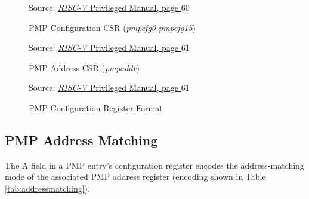 \begin{figure}[htbp]
  \centering
  \def\stackalignment{r}
  {\scriptsize Source: \href{https://drive.google.com/file/d/17GeetSnT5wW3xNuAHI95-SI1gPGd5sJ_/view}{\textit{RISC-V} Privileged Manual, page $60$}}
  \caption{PMP Configuration CSR (\textit{pmpcfg0-pmpcfg15})}
  \label{fig:pmpcfgs}
\end{figure}

\begin{figure}[htbp]
  \centering
  \def\stackalignment{r} %
  {\scriptsize Source: \href{https://drive.google.com/file/d/17GeetSnT5wW3xNuAHI95-SI1gPGd5sJ_/view}{\textit{RISC-V} Privileged Manual, page $61$}}
  \caption{PMP Address CSR (\textit{pmpaddr})}
  \label{fig:pmpaddr}
\end{figure}

\begin{figure}[htbp]
  \centering
  \def\stackalignment{r} %
  {\scriptsize Source: \href{https://drive.google.com/file/d/17GeetSnT5wW3xNuAHI95-SI1gPGd5sJ_/view}{\textit{RISC-V} Privileged Manual, page $61$}}
  \caption{PMP Configuration Register Format}
  \label{fig:pmpconf}
\end{figure}

\subsection{PMP Address Matching}
\label{subsec:pmpaddressmatching}

The A field in a PMP entry's configuration register encodes the address-matching
mode of the associated PMP address register (encoding shown in Table \ref{tab:addressmatching}).

